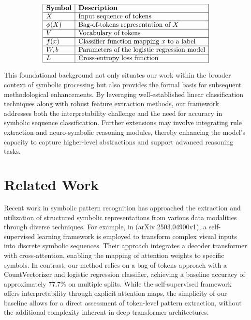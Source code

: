 \documentclass{article}
\begin{document}
\[
\begin{array}{|l|l|}
\hline
\textbf{Symbol} & \textbf{Description} \\ \hline
X & \text{Input sequence of tokens} \\ \hline
\phi(X) & \text{Bag-of-tokens representation of } X \\ \hline
V & \text{Vocabulary of tokens} \\ \hline
f(x) & \text{Classifier function mapping } x \text{ to a label} \\ \hline
W, b & \text{Parameters of the logistic regression model} \\ \hline
L & \text{Cross-entropy loss function} \\ \hline
\end{array}
\]

This foundational background not only situates our work within the broader context of symbolic processing but also provides the formal basis for subsequent methodological enhancements. By leveraging well-established linear classification techniques along with robust feature extraction methods, our framework addresses both the interpretability challenge and the need for accuracy in symbolic sequence classification. Further extensions may involve integrating rule extraction and neuro-symbolic reasoning modules, thereby enhancing the model's capacity to capture higher-level abstractions and support advanced reasoning tasks.

\section{Related Work}
Recent work in symbolic pattern recognition has approached the extraction and utilization of structured symbolic representations from various data modalities through diverse techniques. For example, in (arXiv 2503.04900v1), a self-supervised learning framework is employed to transform complex visual inputs into discrete symbolic sequences. Their approach integrates a decoder transformer with cross-attention, enabling the mapping of attention weights to specific symbols. In contrast, our method relies on a bag-of-tokens approach with a CountVectorizer and logistic regression classifier, achieving a baseline accuracy of approximately 77.7\% on multiple splits. While the self-supervised framework offers interpretability through explicit attention maps, the simplicity of our baseline allows for a direct assessment of token-level pattern extraction, without the additional complexity inherent in deep transformer architectures.
\end{document}
